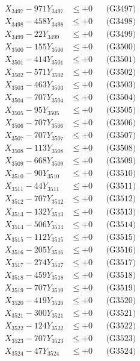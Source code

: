 \documentclass[a4paper,10pt]{article}
\begin{document}
{\begin{align}
X_{3497} - 971Y_{3497} &\leq +0 && \text{(G3497)} \\
X_{3498} - 458Y_{3498} &\leq +0 && \text{(G3498)} \\
X_{3499} - 22Y_{3499} &\leq +0 && \text{(G3499)} \\
X_{3500} - 155Y_{3500} &\leq +0 && \text{(G3500)} \\
\allowbreak
X_{3501} - 414Y_{3501} &\leq +0 && \text{(G3501)} \\
X_{3502} - 571Y_{3502} &\leq +0 && \text{(G3502)} \\
X_{3503} - 463Y_{3503} &\leq +0 && \text{(G3503)} \\
X_{3504} - 707Y_{3504} &\leq +0 && \text{(G3504)} \\
X_{3505} - 95Y_{3505} &\leq +0 && \text{(G3505)} \\
X_{3506} - 707Y_{3506} &\leq +0 && \text{(G3506)} \\
X_{3507} - 707Y_{3507} &\leq +0 && \text{(G3507)} \\
X_{3508} - 113Y_{3508} &\leq +0 && \text{(G3508)} \\
X_{3509} - 668Y_{3509} &\leq +0 && \text{(G3509)} \\
X_{3510} - 90Y_{3510} &\leq +0 && \text{(G3510)} \\
\allowbreak
X_{3511} - 44Y_{3511} &\leq +0 && \text{(G3511)} \\
X_{3512} - 707Y_{3512} &\leq +0 && \text{(G3512)} \\
X_{3513} - 132Y_{3513} &\leq +0 && \text{(G3513)} \\
X_{3514} - 506Y_{3514} &\leq +0 && \text{(G3514)} \\
X_{3515} - 112Y_{3515} &\leq +0 && \text{(G3515)} \\
X_{3516} - 205Y_{3516} &\leq +0 && \text{(G3516)} \\
X_{3517} - 274Y_{3517} &\leq +0 && \text{(G3517)} \\
X_{3518} - 459Y_{3518} &\leq +0 && \text{(G3518)} \\
X_{3519} - 707Y_{3519} &\leq +0 && \text{(G3519)} \\
X_{3520} - 419Y_{3520} &\leq +0 && \text{(G3520)} \\
\allowbreak
X_{3521} - 300Y_{3521} &\leq +0 && \text{(G3521)} \\
X_{3522} - 124Y_{3522} &\leq +0 && \text{(G3522)} \\
X_{3523} - 707Y_{3523} &\leq +0 && \text{(G3523)} \\
X_{3524} - 47Y_{3524} &\leq +0 && \text{(G3524)} \\

\end{align}}
\end{document}
